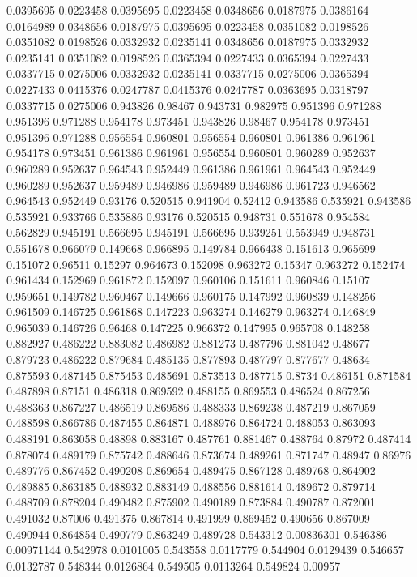 0.0395695 0.0223458
0.0395695 0.0223458
0.0348656 0.0187975
0.0386164 0.0164989
0.0348656 0.0187975
0.0395695 0.0223458
0.0351082 0.0198526
0.0351082 0.0198526
0.0332932 0.0235141
0.0348656 0.0187975
0.0332932 0.0235141
0.0351082 0.0198526
0.0365394 0.0227433
0.0365394 0.0227433
0.0337715 0.0275006
0.0332932 0.0235141
0.0337715 0.0275006
0.0365394 0.0227433
0.0415376 0.0247787
0.0415376 0.0247787
0.0363695 0.0318797
0.0337715 0.0275006
0.943826 0.98467
0.943731 0.982975
0.951396 0.971288
0.951396 0.971288
0.954178 0.973451
0.943826 0.98467
0.954178 0.973451
0.951396 0.971288
0.956554 0.960801
0.956554 0.960801
0.961386 0.961961
0.954178 0.973451
0.961386 0.961961
0.956554 0.960801
0.960289 0.952637
0.960289 0.952637
0.964543 0.952449
0.961386 0.961961
0.964543 0.952449
0.960289 0.952637
0.959489 0.946986
0.959489 0.946986
0.961723 0.946562
0.964543 0.952449
0.93176 0.520515
0.941904 0.52412
0.943586 0.535921
0.943586 0.535921
0.933766 0.535886
0.93176 0.520515
0.948731 0.551678
0.954584 0.562829
0.945191 0.566695
0.945191 0.566695
0.939251 0.553949
0.948731 0.551678
0.966079 0.149668
0.966895 0.149784
0.966438 0.151613
0.965699 0.151072
0.96511 0.15297
0.964673 0.152098
0.963272 0.15347
0.963272 0.152474
0.961434 0.152969
0.961872 0.152097
0.960106 0.151611
0.960846 0.15107
0.959651 0.149782
0.960467 0.149666
0.960175 0.147992
0.960839 0.148256
0.961509 0.146725
0.961868 0.147223
0.963274 0.146279
0.963274 0.146849
0.965039 0.146726
0.96468 0.147225
0.966372 0.147995
0.965708 0.148258
0.882927 0.486222
0.883082 0.486982
0.881273 0.487796
0.881042 0.48677
0.879723 0.486222
0.879684 0.485135
0.877893 0.487797
0.877677 0.48634
0.875593 0.487145
0.875453 0.485691
0.873513 0.487715
0.8734 0.486151
0.871584 0.487898
0.87151 0.486318
0.869592 0.488155
0.869553 0.486524
0.867256 0.488363
0.867227 0.486519
0.869586 0.488333
0.869238 0.487219
0.867059 0.488598
0.866786 0.487455
0.864871 0.488976
0.864724 0.488053
0.863093 0.488191
0.863058 0.48898
0.883167 0.487761
0.881467 0.488764
0.87972 0.487414
0.878074 0.489179
0.875742 0.488646
0.873674 0.489261
0.871747 0.48947
0.86976 0.489776
0.867452 0.490208
0.869654 0.489475
0.867128 0.489768
0.864902 0.489885
0.863185 0.488932
0.883149 0.488556
0.881614 0.489672
0.879714 0.488709
0.878204 0.490482
0.875902 0.490189
0.873884 0.490787
0.872001 0.491032
0.87006 0.491375
0.867814 0.491999
0.869452 0.490656
0.867009 0.490944
0.864854 0.490779
0.863249 0.489728
0.543312 0.00836301
0.546386 0.00971144
0.542978 0.0101005
0.543558 0.0117779
0.544904 0.0129439
0.546657 0.0132787
0.548344 0.0126864
0.549505 0.0113264
0.549824 0.00957

